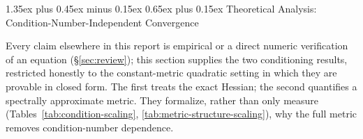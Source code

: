 \documentclass[10pt,twocolumn]{article}
\makeatletter
\renewcommand\section{\@startsection{section}{1}{0pt}%
  {1.35ex plus 0.45ex minus 0.15ex}%
  {0.65ex plus 0.15ex}%
  {\large\bfseries}}
\makeatother
\begin{document}
\section{Theoretical Analysis: Condition-Number-Independent Convergence}
\label{sec:theory}

Every claim elsewhere in this report is empirical or a direct numeric
verification of an equation (\S\ref{sec:review}); this section supplies the
two conditioning results, restricted honestly to the constant-metric
quadratic setting in which they are provable in closed form. The first treats
the exact Hessian; the second quantifies a spectrally approximate metric. They
formalize, rather than only measure
(Tables~\ref{tab:condition-scaling}, \ref{tab:metric-structure-scaling}),
why the full metric removes condition-number dependence.
\end{document}
